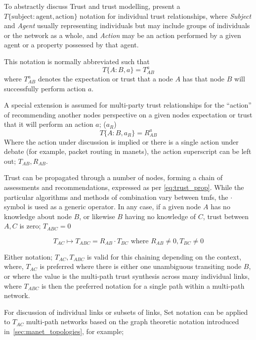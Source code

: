 To abstractly discuss Trust and trust modelling, \citet{Liu2006} present a $T\{\text{subject}:\text{agent},\text{action}\}$ notation for individual trust relationships, where \emph{Subject} and \emph{Agent} usually representing individuals but may include groups of individuals or the network as a whole, and \emph{Action} may be an action performed by a given agent or a property possessed by that agent.

This notation is normally abbreviated such that 
\begin{equation}
  \label{eq:trust_notation}
  T\{A:B,a\} = T^a_{AB}
\end{equation} 
where $T^a_{AB}$ denotes the expectation or trust that a node $A$ has that node $B$ will successfully perform action $a$.

A special extension is assumed for multi-party trust relationships for the ``action'' of recommending another nodes perspective on a given nodes expectation or trust that it will perform an action $a$; ($a_R$)
%
\begin{equation}
  \label{eq:recommendation_notation}
  T\{A:B,a_R\} = R^a_{AB}
\end{equation}
%
Where the action under discussion is implied or there is a single action under debate (for example, packet routing in \glspl{manet}), the action superscript can be left out; $T_{AB} , R_{AB}$.

Trust can be propagated through a number of nodes, forming a chain of assessments and recommendations, expressed as per \eqref{eq:trust_prop}.
While the particular algorithms and methods of combination vary between \glspl{tmf}, the $\cdot$ symbol is used as a generic operator.
In any case, if a given node $A$ has no knowledge about node $B$, or likewise $B$ having no knowledge of $C$, trust between $A,C$ is zero; $T_{ABC} = 0$

\begin{equation}
	\label{eq:trust_prop}
	T_ {AC}\mapsto T_{ABC} = R_{AB} \cdot T_{BC} \text{ where } R_{AB} \neq 0 , T_{BC} \neq 0
\end{equation}

Either notation; $T_{AC}, T_{ABC}$ is valid for this chaining depending on the context, where, $T_{AC}$ is preferred where there is either one unambiguous transiting node $B$, or where the value is the multi-path trust synthesis across many individual links, where $T_{ABC}$ is then the preferred notation for a single path within a multi-path network.

For discussion of individual links or subsets of links, Set notation can be applied to $T_{AC}$ multi-path networks based on the graph theoretic notation introduced in~\autoref{sec:manet_topologies}, for example;


